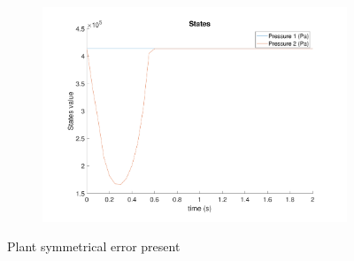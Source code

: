 \documentclass[11pt,a4paper]{article}
\begin{document}
\begin{figure}[!hbt]
\begin{subfigure}[t]{0.45\textwidth}
    \caption{}
    \end{subfigure}
    ~
    \begin{subfigure}[t]{0.45\textwidth}
    \centering
    \includegraphics[width=\textwidth]{figure8.pdf}
    \caption{}
    \end{subfigure}
    \caption{Plant symmetrical error present}
    \label{fig:simulated_symmectrical_error_2}
\end{figure}
\end{document}
